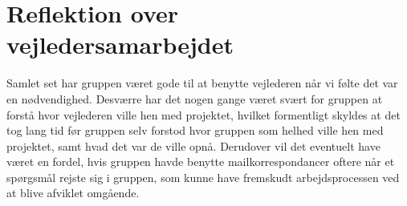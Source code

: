 \section{Reflektion over vejledersamarbejdet}\label{Reflektion-over-vejledersamarbejdet}
Samlet set har gruppen været gode til at benytte vejlederen når vi følte det var en nødvendighed. Desværre har det nogen gange været svært for gruppen at forstå hvor vejlederen ville hen med projektet, hvilket formentligt skyldes at det tog lang tid før gruppen selv forstod hvor gruppen som helhed ville hen med projektet, samt hvad det var de ville opnå. Derudover vil det eventuelt have været en fordel, hvis gruppen havde benytte mailkorrespondancer oftere når et spørgsmål rejste sig i gruppen, som kunne have fremskudt arbejdsprocessen ved at blive afviklet omgående.